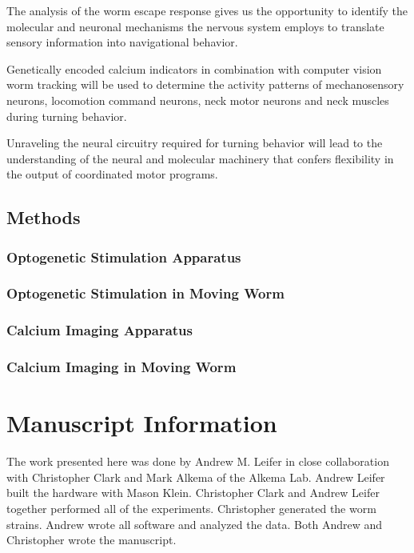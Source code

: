 The analysis of the worm escape response gives us the  opportunity to identify the molecular and neuronal mechanisms  the nervous system employs to translate sensory information into navigational behavior. 

Genetically encoded calcium indicators in combination with  computer vision worm tracking will be used to determine the activity patterns of mechanosensory neurons, locomotion command neurons, neck motor neurons and neck muscles during turning behavior.  

Unraveling the neural circuitry required for turning behavior will lead to the understanding of the neural and molecular machinery that confers flexibility in the output of coordinated motor programs.



\subsection{Methods}


\subsubsection{Optogenetic Stimulation Apparatus}



\subsubsection{Optogenetic Stimulation in Moving Worm}


\subsubsection{Calcium Imaging Apparatus}
\subsubsection{Calcium Imaging in Moving Worm}

\section{Manuscript Information}
The work presented here was done by Andrew M. Leifer in close collaboration with Christopher Clark and Mark Alkema of the Alkema Lab. Andrew Leifer built the hardware with Mason Klein. Christopher Clark and Andrew Leifer together performed all of the experiments. Christopher generated the worm strains. Andrew wrote all software and analyzed the data. Both Andrew and Christopher wrote the manuscript.






